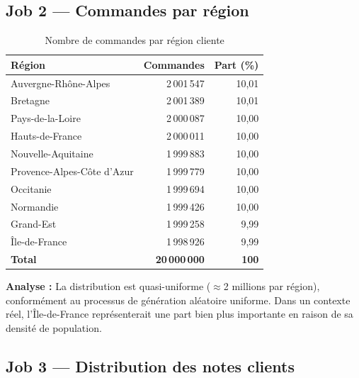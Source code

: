 \documentclass[12pt,a4paper]{article}
\begin{document}
\subsection{Job 2 — Commandes par région}

\begin{table}[H]
  \centering
  \caption{Nombre de commandes par région cliente}
  \label{tab:region}
  \begin{tabular}{lrr}
    \toprule
    \textbf{Région} & \textbf{Commandes} & \textbf{Part (\%)} \\
    \midrule
    Auvergne-Rhône-Alpes       & 2\,001\,547 & 10,01 \\
    Bretagne                   & 2\,001\,389 & 10,01 \\
    Pays-de-la-Loire           & 2\,000\,087 & 10,00 \\
    Hauts-de-France            & 2\,000\,011 & 10,00 \\
    Nouvelle-Aquitaine         & 1\,999\,883 & 10,00 \\
    Provence-Alpes-Côte d'Azur & 1\,999\,779 & 10,00 \\
    Occitanie                  & 1\,999\,694 & 10,00 \\
    Normandie                  & 1\,999\,426 & 10,00 \\
    Grand-Est                  & 1\,999\,258 & 9,99  \\
    Île-de-France              & 1\,998\,926 & 9,99  \\
    \midrule
    \textbf{Total}             & \textbf{20\,000\,000} & \textbf{100} \\
    \bottomrule
  \end{tabular}
\end{table}

\textbf{Analyse :} La distribution est quasi-uniforme ($\approx$2 millions par région),
conformément au processus de génération aléatoire uniforme. Dans un contexte réel,
l'Île-de-France représenterait une part bien plus importante en raison de sa densité
de population.

\subsection{Job 3 — Distribution des notes clients}
\end{document}
